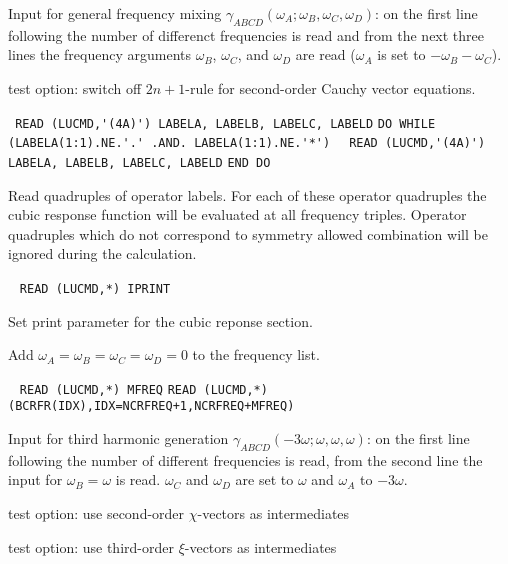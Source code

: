 \begin{description}
Input for general frequency mixing
$\gamma_{ABCD}(\omega_A;\omega_B,\omega_C,\omega_D)$: on the first line
following  the number of differenct frequencies
is read and from the next three lines the frequency arguments 
$\omega_B$, $\omega_C$, and $\omega_D$ are read
($\omega_A$ is set to $-\omega_B-\omega_C$).
                                                           
\item[\Key{NO2NP1}] test option: switch off $2n+1$-rule for second-order
                    Cauchy vector equations.
 
\item[\Key{OPERAT}] \verb| |\newline
\verb|READ (LUCMD,'(4A)') LABELA, LABELB, LABELC, LABELD|\newline
\verb|DO WHILE (LABELA(1:1).NE.'.' .AND. LABELA(1:1).NE.'*')|\newline
\verb|  READ (LUCMD,'(4A)') LABELA, LABELB, LABELC, LABELD|\newline
\verb|END DO|

Read quadruples of operator labels.
For each of these operator quadruples the cubic response
function will be evaluated at all frequency triples.
Operator quadruples which do not correspond to symmetry allowed
combination will be ignored during the calculation. 

\item[\Key{PRINT }] \verb| |\newline
\verb|READ (LUCMD,*) IPRINT|

Set print parameter for the cubic reponse section.

\item[\Key{STATIC}] 
Add $\omega_A = \omega_B = \omega_C = \omega_D = 0$ to the frequency list.

\item[\Key{THGFRE}] \verb| |\newline
\verb|READ (LUCMD,*) MFREQ|\newline
\verb|READ (LUCMD,*) (BCRFR(IDX),IDX=NCRFREQ+1,NCRFREQ+MFREQ)|

Input for third harmonic generation
$\gamma_{ABCD}(-3\omega;\omega,\omega,\omega)$:
on the first line following  the number of different
frequencies is read, from the second line the input for
$\omega_B = \omega$ is read. $\omega_C$ and $\omega_D$ are set to 
$\omega$ and $\omega_A$ to $-3\omega$. 
 
\item[\Key{USECHI}]
test option: use second-order $\chi$-vectors as intermediates
 
\item[\Key{USEXKS}] 
test option: use third-order $\xi$-vectors as intermediates
 
%

\end{description}

